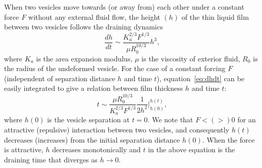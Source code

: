 \documentclass[%
preprint,
 amsmath,amssymb,
 aps,
]{revtex4-1}
\begin{document}
When two vesicles move towards (or away from) each other under a constant force $F$ without any external fluid flow, the height  $(h)$ of the thin liquid film between two vesicles follows the
draining dynamics \cite{RamachandranLeal2010_PoF}
\begin{equation}
\label{eq:dhdt}
\frac{d h}{dt} \sim \frac{K_a^{2/3} F^{1/3}}{\mu R_0^{10/3}} h^3,
\end{equation}
where $K_a$ is the area expansion modulus, $\mu$ is the viscosity of exterior fluid, $R_0$ is the radius of the undeformed vesicle.
For the case of a constant forcing $F$ (independent of separation distance $h$ and time $t$), equation~\ref{eq:dhdt} can be easily integrated to give
a relation between film thickness $h$ and time $t$:
\begin{equation}
t \sim \frac{\mu R_0^{10/3}}{K_a^{2/3} F^{1/3}}\frac{1}{2 h^2} \bigg|^{h(t)}_{h(0)},
\end{equation}
where $h(0)$ is the vesicle separation at $t=0$.
We note that $F< (>) 0$ for an attractive  (repulsive) interaction between two vesicles,  and consequently $h(t)$ decreases (increases) from  the initial separation distance $h(0)$. 
When the force is attractive, $h$ decreases monotonically and $t$ in the above
equation is the
draining time that diverges as $h\rightarrow 0$.
\end{document}
